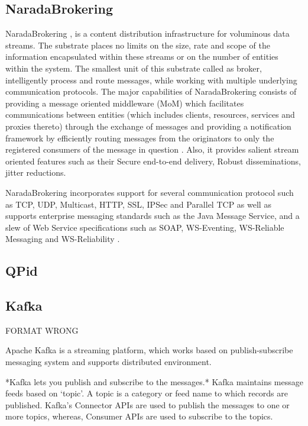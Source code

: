 \subsection{NaradaBrokering}

     NaradaBrokering \cite{www-narada}, is a content distribution
     infrastructure for voluminous data streams. The substrate places
     no limits on the size, rate and scope of the information
     encapsulated within these streams or on the number of entities
     within the system. The smallest unit of this substrate called as
     broker, intelligently process and route messages, while working
     with multiple underlying communication protocols. The major
     capabilities of NaradaBrokering consists of providing a message
     oriented middleware (MoM) which facilitates communications
     between entities (which includes clients, resources, services and
     proxies thereto) through the exchange of messages and providing a
     notification framework by efficiently routing messages from the
     originators to only the registered consumers of the message in
     question \cite{paper-nb-sustrate}. Also, it provides salient
     stream oriented features such as their Secure end-to-end
     delivery, Robust disseminations, jitter reductions.

     NaradaBrokering incorporates support for several communication
     protocol such as TCP, UDP, Multicast, HTTP, SSL, IPSec and
     Parallel TCP as well as supports enterprise messaging standards
     such as the Java Message Service, and a slew of Web Service
     specifications such as SOAP, WS-Eventing, WS-Reliable Messaging
     and WS-Reliability \cite{www-narada-features}.

     
\subsection{QPid}
\subsection{Kafka \cv}

     FORMAT WRONG 

     Apache Kafka is a streaming platform, which works based on
     publish-subscribe messaging system and supports distributed
     environment.
      
     *Kafka lets you publish and subscribe to the messages.* Kafka
     maintains message feeds based on ‘topic’. A topic is a category
     or feed name to which records are published. Kafka’s Connector
     APIs are used to publish the messages to one or more topics,
     whereas, Consumer APIs are used to subscribe to the topics.


